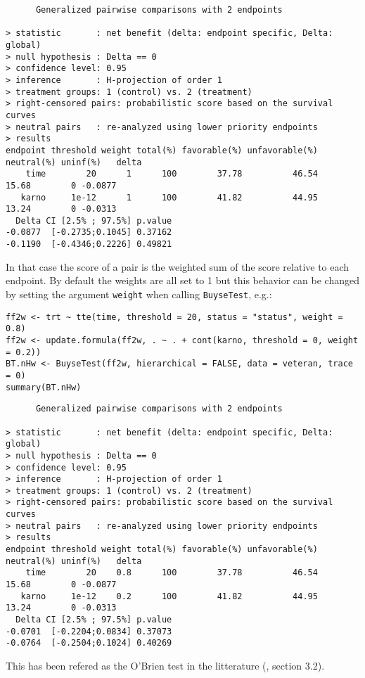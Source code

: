 \documentclass[12pt]{article}
\begin{document}
\begin{verbatim}
      Generalized pairwise comparisons with 2 endpoints

> statistic       : net benefit (delta: endpoint specific, Delta: global) 
> null hypothesis : Delta == 0 
> confidence level: 0.95 
> inference       : H-projection of order 1
> treatment groups: 1 (control) vs. 2 (treatment) 
> right-censored pairs: probabilistic score based on the survival curves
> neutral pairs   : re-analyzed using lower priority endpoints
> results
endpoint threshold weight total(%) favorable(%) unfavorable(%) neutral(%) uninf(%)   delta
    time        20      1      100        37.78          46.54      15.68        0 -0.0877
   karno     1e-12      1      100        41.82          44.95      13.24        0 -0.0313
  Delta CI [2.5% ; 97.5%] p.value 
-0.0877  [-0.2735;0.1045] 0.37162 
-0.1190  [-0.4346;0.2226] 0.49821
\end{verbatim}

In that case the score of a pair is the weighted sum of the score
relative to each endpoint. By default the weights are all set to 1 but
this behavior can be changed by setting the argument \texttt{weight} when
calling \texttt{BuyseTest}, e.g.:
\lstset{language=r,label= ,caption= ,captionpos=b,numbers=none}
\begin{lstlisting}
ff2w <- trt ~ tte(time, threshold = 20, status = "status", weight = 0.8)
ff2w <- update.formula(ff2w, . ~ . + cont(karno, threshold = 0, weight = 0.2))
BT.nHw <- BuyseTest(ff2w, hierarchical = FALSE, data = veteran, trace = 0)
summary(BT.nHw)
\end{lstlisting}

\begin{verbatim}
      Generalized pairwise comparisons with 2 endpoints

> statistic       : net benefit (delta: endpoint specific, Delta: global) 
> null hypothesis : Delta == 0 
> confidence level: 0.95 
> inference       : H-projection of order 1
> treatment groups: 1 (control) vs. 2 (treatment) 
> right-censored pairs: probabilistic score based on the survival curves
> neutral pairs   : re-analyzed using lower priority endpoints
> results
endpoint threshold weight total(%) favorable(%) unfavorable(%) neutral(%) uninf(%)   delta
    time        20    0.8      100        37.78          46.54      15.68        0 -0.0877
   karno     1e-12    0.2      100        41.82          44.95      13.24        0 -0.0313
  Delta CI [2.5% ; 97.5%] p.value 
-0.0701  [-0.2204;0.0834] 0.37073 
-0.0764  [-0.2504;0.1024] 0.40269
\end{verbatim}
This has been refered as the O’Brien test in the litterature
(\cite{verbeeck2019generalized}, section 3.2).
\end{document}
